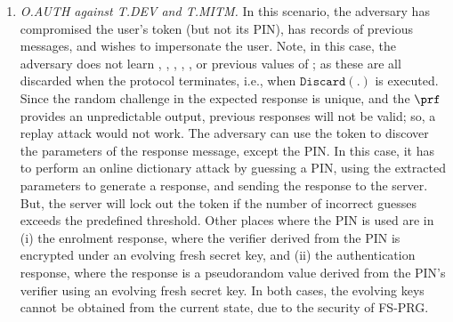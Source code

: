 \begin{enumerate}[leftmargin=5mm]
\item\textit{O.AUTH against T.DEV and T.MITM.}\label{O.AUTH:T.DEV-plus-T.MITM}
In this scenario, the adversary has compromised the user's token (but not its PIN), has records of previous messages, and wishes to impersonate the user. Note, in this case, the adversary does not learn \VC{\verifier}, \VM{\trans}, \VC{\pin}, , ,  or previous values of \VC{\state}; as these are all discarded when the protocol terminates, i.e., when $\mathtt{Discard}(.)$ is executed. 
%
Since the random challenge in the expected response is unique, and the $\prf$ provides an unpredictable output, previous responses will not be valid; so, a replay attack would not work. The adversary can use the token to discover the parameters of the response message, except the PIN. In this case, it has to perform an online dictionary attack by guessing a PIN, using the extracted parameters to generate a response, and sending the response to the server. But, the server will lock out the token if the number of incorrect guesses exceeds the predefined threshold. Other places where the PIN is used are in (i) the enrolment response, where the verifier derived from the PIN is encrypted under an evolving fresh secret key, and (ii) the authentication response, where the response is a pseudorandom value derived from the PIN's verifier using an evolving fresh secret key. In both cases, the evolving keys cannot be obtained from the current state, due to the security of FS-PRG. 




\end{enumerate}
